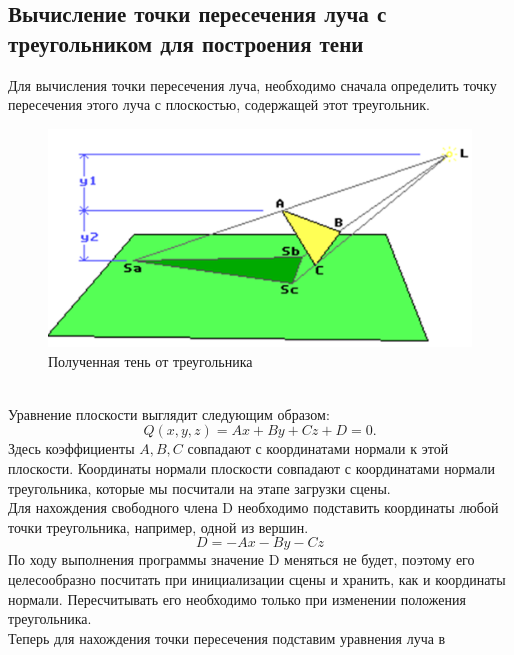 \documentclass[a4paper, 10pt]{article}
\begin{document}
	\subsection{Вычисление точки пересечения луча с треугольником для построения тени}
	 \hspace*{5mm} Для вычисления точки пересечения луча, необходимо сначала определить точку пересечения этого луча с плоскостью, содержащей этот треугольник.
	 \begin{figure}[h!]
	 	\centering
	 	\includegraphics[scale=0.8]{ten}
	 	\centering\caption{Полученная тень от треугольника}
	 \end{figure}
 	\\ Уравнение плоскости выглядит следующим образом:
 	\begin{equation}
 		Q(x, y, z) = Ax + By + Cz + D = 0.
 	\end{equation}
 	\hspace*{5mm} Здесь коэффициенты $A, B, C$ совпадают с координатами нормали к этой плоскости. Координаты нормали плоскости совпадают с координатами нормали треугольника, которые мы посчитали на этапе загрузки сцены.
 	\\ \hspace*{5mm} Для нахождения свободного члена D необходимо подставить координаты любой точки треугольника, например, одной из вершин.
 	\begin{equation}
 		D = -Ax -By -Cz
 	\end{equation}
	\hspace*{5mm}По ходу выполнения программы значение D меняться не будет, поэтому его целесообразно посчитать при инициализации сцены и хранить, как и координаты нормали. Пересчитывать его необходимо только при изменении положения треугольника. 
	\\ \hspace*{5mm} Теперь для нахождения точки пересечения подставим уравнения луча в 
\end{document}
